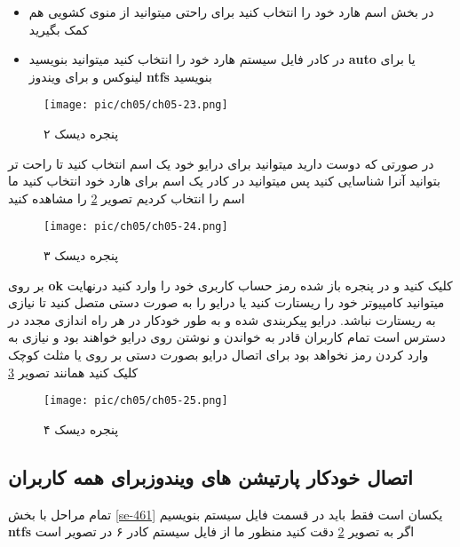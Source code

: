 \begin{enumerate}
\begin{itemize}
								\item در بخش 
								\textbf{}
								اسم هارد خود را انتخاب کنید برای راحتی میتوانید از منوی کشویی هم کمک بگیرید
								\item در کادر
								\textbf{}
								فایل سیستم هارد خود را انتخاب کنید میتوانید بنویسید
								\textbf{auto}
								یا برای لینوکس 
								\textbf{}
								و برای ویندوز
								\textbf{ntfs}
								بنویسید								
\end{itemize}
	\begin{figure}[H]%
	\caption{پنجره دیسک ۲}
	\begin{center}
		\texttt{[image: pic/ch05/ch05-23.png]}
	\end{center}
	\label{pic-59}
\end{figure}
در صورتی که دوست دارید میتوانید برای درایو خود یک اسم انتخاب کنید تا راحت تر بتوانید آنرا شناسایی کنید پس میتوانید در کادر
\textbf{}
یک اسم برای هارد خود انتخاب کنید ما اسم 
\textbf{}
را انتخاب کردیم تصویر
\ref{pic-60}
را مشاهده کنید
	\begin{figure}[H]%
	\caption{پنجره دیسک ۳}
	\begin{center}
		\texttt{[image: pic/ch05/ch05-24.png]}
	\end{center}
	\label{pic-60}
\end{figure}
بر روی 
\textbf{ok}
کلیک کنید
و در پنجره باز شده رمز حساب کاربری خود را وارد کنید
درنهایت میتوانید کامپیوتر خود را ریستارت کنید یا درایو را به صورت دستی متصل کنید تا نیازی به ریستارت نباشد. درایو پیکربندی شده و به طور خودکار در هر راه اندازی مجدد در دسترس است تمام کاربران قادر به خواندن و نوشتن روی درایو خواهند بود و نیازی به وارد کردن رمز نخواهد بود برای اتصال درایو بصورت دستی بر روی
\textbf{}
یا مثلث کوچک کلیک کنید همانند
تصویر
\ref{pic-61}
	\begin{figure}[H]%
	\caption{پنجره دیسک ۴}
	\begin{center}
		\texttt{[image: pic/ch05/ch05-25.png]}
	\end{center}
	\label{pic-61}
\end{figure}
\end{enumerate}
\subsection{اتصال خودکار پارتیشن های ویندوزبرای همه کاربران}\label{se-462}
تمام مراحل با بخش
\ref{se-461}
یکسان است فقط باید در قسمت فایل سیستم بنویسیم
\textbf{ntfs}
اگر به تصویر 
\ref{pic-60}
دقت کنید منظور ما از فایل سیستم کادر ۶ در تصویر است
